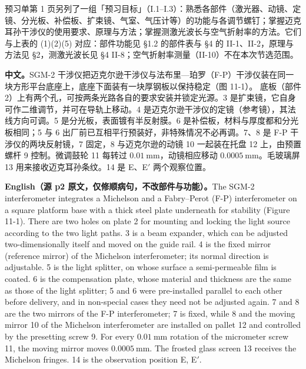 \documentclass[11pt]{ctexart}
\begin{document}
预习单第 1 页另列了一组「预习目标」（I.1--I.3）：熟悉各部件（激光器、动镜、定镜、分光板、补偿板、扩束镜、气室、气压计等）的功能与各调节螺钉；掌握迈克耳孙干涉仪的使用要求、原理与方法；掌握测激光波长与空气折射率的方法。它们与上表的 (1)(2)(5) 对应：部件功能见 §1.2 的部件表与 §4 的 II-1、II-2，原理与方法见 §2，测激光波长见 §4 II-8；空气折射率测量（II-10）不在本次节选范围。


\textbf{中文。}SGM-2 干涉仪把迈克尔逊干涉仪与法布里—珀罗（F-P）干涉仪装在同一块方形平台底座上，底座下面装有一块厚钢板以保持稳定（图 11-1）。
底板（部件 2）上有两个孔，可按两条光路各自的要求安装并锁定光源。3 是扩束镜，它自身可作二维调节，并可在导轨上移动。4 是迈克尔逊干涉仪的定镜（参考镜），其法线方向可调。5 是分光板，表面镀有半反射膜。6 是补偿板，材料与厚度都和分光板相同；5 与 6 出厂前已互相平行预装好，非特殊情况不必再调。7、8 是 F-P 干涉仪的两块反射镜，7 固定，8 与迈克尔逊的动镜 10 一起装在托盘 12 上，由预置螺杆 9 控制。微调鼓轮 11 每转过 $0.01\ \mathrm{mm}$，动镜相应移动 $0.0005\ \mathrm{mm}$。毛玻璃屏 13 用来接收迈克耳孙条纹。14 是 E、E$'$ 两个观察位置。

\textbf{English（源 p2 原文，仅修顺病句，不改部件与功能）。}The SGM-2 interferometer integrates a Michelson and a Fabry--Perot (F-P) interferometer on a square platform base with a thick steel plate underneath for stability (Figure 11-1). There are two holes on plate 2 for mounting and locking the light source according to the two light paths. 3 is a beam expander, which can be adjusted two-dimensionally itself and moved on the guide rail. 4 is the fixed mirror (reference mirror) of the Michelson interferometer; its normal direction is adjustable. 5 is the light splitter, on whose surface a semi-permeable film is coated. 6 is the compensation plate, whose material and thickness are the same as those of the light splitter; 5 and 6 were pre-installed parallel to each other before delivery, and in non-special cases they need not be adjusted again. 7 and 8 are the two mirrors of the F-P interferometer; 7 is fixed, while 8 and the moving mirror 10 of the Michelson interferometer are installed on pallet 12 and controlled by the presetting screw 9. For every $0.01\ \mathrm{mm}$ rotation of the micrometer screw 11, the moving mirror moves $0.0005\ \mathrm{mm}$. The frosted glass screen 13 receives the Michelson fringes. 14 is the observation position E, E$'$.
\end{document}
